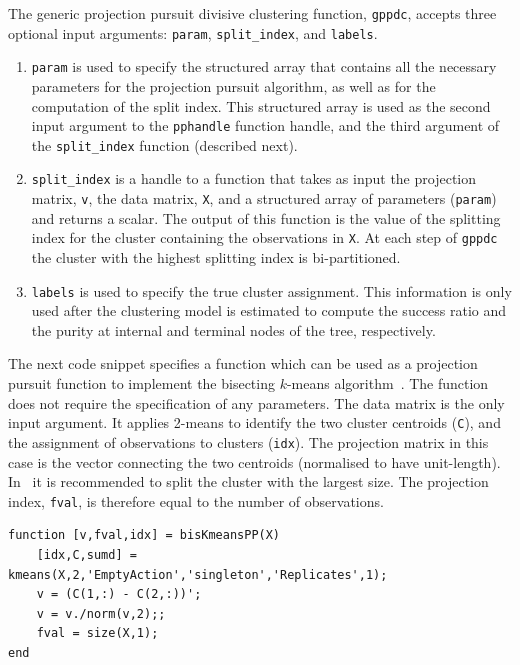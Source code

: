 \documentclass{book}
\begin{document}
The generic projection pursuit divisive clustering function, {\tt gppdc},
accepts three optional input arguments: {\tt param}, {\tt split\_index}, and
{\tt labels}.

\begin{enumerate}

\item {\tt param} is used to specify the structured array that contains
all the necessary parameters for the projection pursuit
algorithm, as well as for the computation of the split index.
%
This structured array is used as
the second input argument to the {\tt pphandle} function handle, and
the third argument of the {\tt split\_index} function (described next).

\item {\tt split\_index} is a handle to a function that takes as input the
projection matrix, {\tt v}, the data matrix, {\tt X}, and a structured array of
parameters ({\tt param}) and returns a scalar. The output of this function is
the value of the splitting index for the cluster containing the observations in
{\tt X}.
%
At each step of {\tt gppdc} the cluster with the highest splitting index is
bi-partitioned. 

\item {\tt labels} is used to specify the true cluster assignment. This
information is only used after the clustering model is estimated to compute the
success ratio and the purity at internal and terminal nodes of the tree,
respectively.

\end{enumerate}

The next code snippet specifies a function which can be used as a projection
pursuit function to implement the bisecting $k$-means
algorithm~\cite{SteinbachKK2000}. The function does not require the specification 
of any parameters. The data matrix is the only input argument.
It applies 2-means to identify the two cluster centroids ({\tt C}),
and the assignment of observations to clusters ({\tt idx}).
The projection matrix in this case is the vector connecting the two centroids
(normalised to have unit-length). In~\cite{SteinbachKK2000} it is recommended to
split the cluster with the largest size. The projection index, {\tt fval},
is therefore equal to the number of observations.

\begin{verbatim}
function [v,fval,idx] = bisKmeansPP(X)
	[idx,C,sumd] = kmeans(X,2,'EmptyAction','singleton','Replicates',1);
	v = (C(1,:) - C(2,:))';
	v = v./norm(v,2);;
	fval = size(X,1);
end
\end{verbatim}
\end{document}
